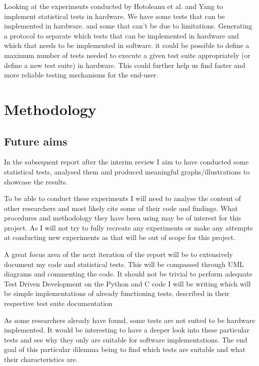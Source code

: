 \documentclass[]{final_report}
\begin{document}
\par{Looking at the experiments conducted by Hotoleanu et al.\cite{Hotoleanu:2010} and Yang\cite{Yang:2016} to implement statistical tests in hardware. We have some tests that can be implemented in hardware. and some that can't be due to limitations. Generating a protocol to separate which tests that can be implemented in hardware and which that needs to be implemented in software. it could be possible to define a maximum number of tests needed to execute a given test suite appropriately (or define a new test suite) in hardware. This could further help us find faster and more reliable testing mechanisms for the end-user.}


\chapter*{Methodology}

\section*{Future aims}

\par{In the subsequent report after the interim review I aim to have conducted some statistical tests, analysed them and produced meaningful graphs/illustrations to showcase the results.}

\par{To be able to conduct these experiments I will need to analyse the content of other researchers and most likely cite some of their code and findings. What procedures and methodology they have been using may be of interest for this project. As I will not try to fully recreate any experiments or make any attempts at conducting new experiments as that will be out of scope for this project.}

\par{A great focus area of the next iteration of the report will be to extensively document my code and statistical tests. This will be compassed through UML diagrams and commenting the code. It should not be trivial to perform adequate Test Driven Development on the Python and C code I will be writing which will be simple implementations of already functioning tests, described in their respective test suite documentation}

\par{As some researchers already have found, some tests are not suited to be hardware implemented. It would be interesting to have a deeper look into these particular tests and see why they only are suitable for software implementations. The end goal of this particular dilemma being to find which tests are suitable and what their characteristics are.}
\end{document}
